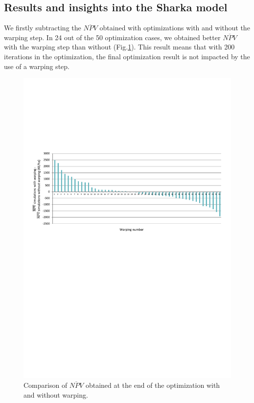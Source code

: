 \subsection{Results and insights into the Sharka model}

We firstly subtracting the $\overline{NPV}$ obtained with optimizations with and without the warping step. In 24 out of the 50 optimization cases, we obtained better $\overline{NPV}$ with the warping step than without (Fig.\ref{fig:waping_moins_sanswarping}). This result means that with 200 iterations in the optimization, the final optimization result is not impacted by the use of a warping step.

\begin{figure}[!ht]
	\centering
	\includegraphics[trim = 0cm 11cm 0cm 6cm, clip]{Figures_Warping_resultats_warping_moins_sanswarping.pdf}
	\caption{Comparison of $\overline{NPV}$ obtained at the end of the optimization with and without warping. }\label{fig:waping_moins_sanswarping}
\end{figure}


